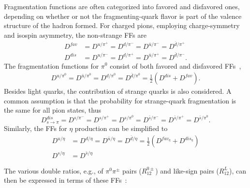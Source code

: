 \documentclass[aps,prX,preprint,groupedaddress,linenumbers]{revtex4-1}
\begin{document}
Fragmentation functions are often categorized into favored and disfavored ones, depending on whether or not the fragmenting-quark flavor is part of the valence structure of the hadron formed. For charged pions, employing charge-symmetry and isospin asymmetry, the non-strange FFs are 
\begin{equation}
\begin{aligned}
D^{fav}&=D^{u/{\pi^+}}=D^{d/{\pi^-}}=D^{\bar{u}/{\pi^-}}=D^{\bar{d}/{\pi^+}}\\
D^{dis}&=D^{u/{\pi^-}}=D^{d/{\pi^+}}=D^{\bar{u}/{\pi^+}}=D^{\bar{d}/{\pi^-}}.
\label{eqn:FF4}
\end{aligned}
\end{equation}
The fragmentation functions for $\pi^0$ consist of both favored and disfavored FFs~\cite{FoundationsofpQCD,Efremov:2006qm},
\begin{equation}
\begin{aligned}
D^{u/{\pi^0}}=D^{\bar{u}/{\pi^0}}=D^{d/{\pi^0}}=D^{\bar{d}/{\pi^0}}=\frac{1}{2}(D^{dis}+D^{fav}).
\label{eqn:FF4pi0}
\end{aligned}
\end{equation}
Besides light quarks, the contribution of strange quarks is also considered.
A common assumption is that the probability for strange-quark fragmentation is the same for all pion states, thus
\begin{equation}
D^{dis}_{s\rightarrow\pi}=D^{s/{\pi^-}}=D^{s/{\pi^+}}=D^{s/{\pi^0}}=D^{\bar{s}/{\pi^-}}=D^{\bar{s}/{\pi^+}}=D^{\bar{s}/{\pi^0}}.
\end{equation}
%
Similarly, the FFs for $\eta$ production can be simplified to 
%
\begin{equation}
\begin{aligned}
D^{u/{\eta}}&=D^{d/{\eta}}=D^{\bar{u}/{\eta}}=D^{\bar{d}/{\eta}}=\frac{1}{2}\left(D^{fav_\eta}+D^{dis_\eta}\right) \\
D^{s/{\eta}}&=D^{\bar{s}/{\eta}}
\label{eqn:FFetaquark}
\end{aligned}
\end{equation}

 
The various double ratios, e.g., of $\pi^0\pi^{\pm}$ pairs ($R^{0\pm}_{12}$) and like-sign pairs ($R^L_{12}$), can then be expressed in terms of these FFs~\cite{Efremov:2006qm}:
\end{document}
